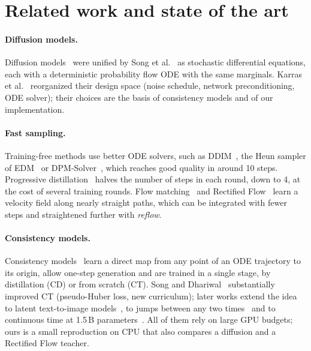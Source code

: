 \documentclass{article}
\begin{document}
\section{Related work and state of the art}
\label{sec:related}

\paragraph{Diffusion models.} Diffusion
models~\cite{sohldickstein2015,ho2020ddpm,song2019ncsn} were unified by Song
et al.~\cite{song2021sde} as stochastic differential equations, each with a
deterministic probability flow ODE with the same marginals. Karras et
al.~\cite{karras2022edm} reorganized their design space (noise schedule,
network preconditioning, ODE solver); their choices are the basis of
consistency models and of our implementation.

\paragraph{Fast sampling.} Training-free methods use better ODE solvers, such
as DDIM~\cite{song2021ddim}, the Heun sampler of EDM~\cite{karras2022edm} or
DPM-Solver~\cite{lu2022dpmsolver}, which reaches good quality in around 10
steps. Progressive distillation~\cite{salimans2022progressive} halves the
number of steps in each round, down to 4, at the cost of several training
rounds. Flow matching~\cite{lipman2023flow} and Rectified
Flow~\cite{liu2023flow} learn a velocity field along nearly straight paths,
which can be integrated with fewer steps and straightened further with
\emph{reflow}.

\paragraph{Consistency models.} Consistency
models~\cite{song2023consistency} learn a direct map from any point of an ODE
trajectory to its origin, allow one-step generation and are trained in a
single stage, by distillation (CD) or from scratch (CT). Song and
Dhariwal~\cite{song2024improved} substantially improved CT (pseudo-Huber
loss, new curriculum); later works extend the idea to latent text-to-image
models~\cite{luo2023lcm}, to jumps between any two times~\cite{kim2024ctm}
and to continuous time at 1.5\,B parameters~\cite{lu2025scm}. All of them rely
on large GPU budgets; ours is a small reproduction on CPU that also compares a
diffusion and a Rectified Flow teacher.
\end{document}
